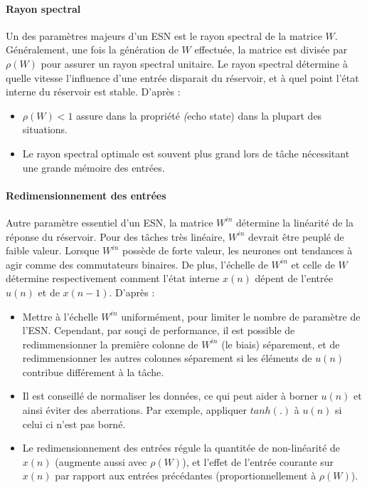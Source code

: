 \documentclass[12pt]{article}
\begin{document}
\paragraph{Rayon spectral}
Un des paramètres majeurs d'un ESN est le rayon spectral de la matrice $W$. Généralement, une fois la génération de $W$ effectuée, la matrice est divisée par $\rho(W)$ pour assurer un rayon spectral unitaire. Le rayon spectral détermine à quelle vitesse l'influence d'une entrée disparait du réservoir, et à quel point l'état interne du réservoir est stable.\newline
D'après \cite{Lukosevicius12}:
\begin{itemize}
\item $\rho(W) < 1$ assure dans la propriété \textit(echo state) dans la plupart des situations.
\item Le rayon spectral optimale est souvent plus grand lors de tâche nécessitant une grande mémoire des entrées.
\end{itemize}

\paragraph{Redimensionnement des entrées}
Autre paramètre essentiel d'un ESN, la matrice $W^{in}$ détermine la linéarité de la réponse du réservoir. Pour des tâches très linéaire, $W^{in}$ devrait être peuplé de faible valeur. Lorsque $W^{in}$ possède de forte valeur, les neurones ont tendances à agir comme des commutateurs binaires. De plus, l'échelle de $W^{in}$ et celle de $W$ détermine respectivement comment l'état interne $x(n)$ dépent de l'entrée $u(n)$ et de $x(n-1)$.\newline
D'après \cite{Lukosevicius12}:
\begin{itemize}
\item Mettre à l'échelle $W^{in}$ uniformément, pour limiter le nombre de paramètre de l'ESN. Cependant, par souçi de performance, il est possible de redimmensionner la première colonne de $W^{in}$ (le biais) séparement, et de redimmensionner les autres colonnes séparement si les éléments de $u(n)$ contribue différement à la tâche.
\item Il est conseillé de normaliser les données, ce qui peut aider à borner $u(n)$ et ainsi éviter des aberrations. Par exemple, appliquer $tanh(.)$ à $u(n)$ si celui ci n'est pas borné.
\item Le redimensionnement des entrées régule la quantitée de non-linéarité de $x(n)$ (augmente aussi avec $\rho(W)$), et l'effet de l'entrée courante sur $x(n)$ par rapport aux entrées précédantes (proportionnellement à $\rho(W)$).
\end{itemize}
\end{document}
